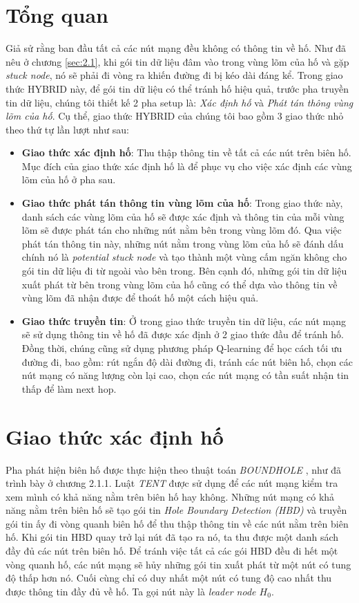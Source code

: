 \documentclass[12pt]{report}
\begin{document}
\section{Tổng quan}
\label{sec:4.2}
Giả sử rằng ban đầu tất cả các nút mạng đều không có thông tin về hố. Như đã nêu ở chương \ref{sec:2.1}, khi gói tin dữ liệu đâm vào trong vùng lõm của hố và gặp \textit{stuck node}, nó sẽ phải đi vòng ra khiến đường đi bị kéo dài đáng kể. Trong giao thức HYBRID này, để gói tin dữ liệu có thể tránh hố hiệu quả, trước pha truyền tin dữ liệu, chúng tôi thiết kế 2 pha setup là: \textit{Xác định hố} và \textit{Phát tán thông vùng lõm của hố}. Cụ thể, giao thức HYBRID của chúng tôi bao gồm 3 giao thức nhỏ theo thứ tự lần lượt như sau:
\begin{itemize}
\item \textbf{Giao thức xác định hố}: Thu thập thông tin về tất cả các nút trên biên hố. Mục đích của giao thức xác định hố là để phục vụ cho việc xác định các vùng lõm của hố ở pha sau.
\item \textbf{Giao thức phát tán thông tin vùng lõm của hố}: Trong giao thức này, danh sách các vùng lõm của hố sẽ được xác định và thông tin của mỗi vùng lõm sẽ được phát tán cho những nút nằm bên trong vùng lõm đó. Qua việc phát tán thông tin này, những nút nằm trong vùng lõm của hố sẽ đánh dấu chính nó là \textit{potential stuck node} và tạo thành một vùng cấm ngăn không cho gói tin dữ liệu đi từ ngoài vào bên trong. Bên cạnh đó, những gói tin dữ liệu xuất phát từ bên trong vùng lõm của hố cũng có thể dựa vào thông tin về vùng lõm đã nhận được để thoát hố một cách hiệu quả.
\item \textbf{Giao thức truyền tin}: Ở trong giao thức truyền tin dữ liệu, các nút mạng sẽ sử dụng thông tin về hố đã được xác định ở 2 giao thức đầu để tránh hố. Đồng thời, chúng cũng sử dụng phương pháp Q-learning để học cách tối ưu đường đi, bao gồm: rút ngắn độ dài đường đi, tránh các nút biên hố, chọn các nút mạng có năng lượng còn lại cao, chọn các nút mạng có tần suất nhận tin thấp để làm next hop.  
\end{itemize}
\section{Giao thức xác định hố}
\label{sec:4.3}
Pha phát hiện biên hố được thực hiện theo thuật toán \textit{BOUNDHOLE} \cite{boundhole}, như đã trình bày ở chương 2.1.1. Luật \textit{TENT} được sử dụng để các nút mạng kiểm tra xem mình có khả năng nằm trên biên hố hay không. Những nút mạng có khả năng nằm trên biên hố sẽ tạo gói tin \textit{Hole Boundary Detection (HBD)} và truyền gói tin ấy đi vòng quanh biên hố để thu thập thông tin về các nút nằm trên biên hố. Khi gói tin HBD quay trở lại nút đã tạo ra nó, ta thu được một danh sách đầy đủ các nút trên biên hố. Để tránh việc tất cả các gói HBD đều đi hết một vòng quanh hố, các nút mạng sẽ hủy những gói tin xuất phát từ một nút có tung độ thấp hơn nó. Cuối cùng chỉ có duy nhất một nút có tung độ cao nhất thu được thông tin đầy đủ về hố. Ta gọi nút này là \textit{leader node $ H_{0}$}. 
\end{document}
